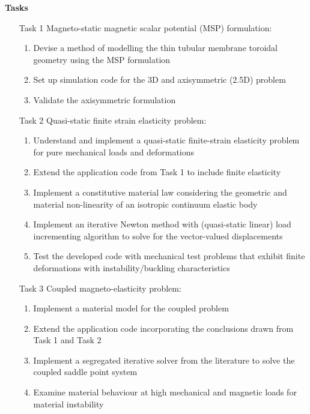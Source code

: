 \begin{center}
\Huge \bf Tasks
\end{center}
\label{sec:task_list}
\begin{enumerate}
\item[Task 1] Magneto-static magnetic scalar potential (MSP) formulation:
\begin{enumerate}
\item Devise a method of modelling the thin tubular membrane toroidal geometry using the MSP formulation 
\item Set up simulation code for the 3D and axisymmetric (2.5D) problem
\item Validate the axisymmetric formulation 
\end{enumerate}
\item[Task 2] Quasi-static finite strain elasticity problem:
\begin{enumerate}
\item Understand and implement a quasi-static finite-strain elasticity problem for pure mechanical loads and deformations \cite{Pelteret2016a, Pelteret2012}
\item Extend the application code from Task 1 to include finite elasticity
\item Implement a constitutive material law considering the geometric and material non-linearity of an isotropic continuum elastic body \cite{Wriggers2008}
\item Implement an iterative Newton method with (quasi-static linear) load incrementing algorithm to solve for the vector-valued displacements
\item Test the developed code with mechanical test problems that exhibit finite deformations with instability/buckling characteristics
\end{enumerate}
\item[Task 3] Coupled magneto-elasticity problem:
\begin{enumerate}
\item Implement a material model for the coupled problem \cite{pelteret2016, Saxena2015}
\item Extend the application code incorporating the conclusions drawn from Task 1 and Task 2
\item Implement a segregated iterative solver from the literature \cite{Benzi2005} to solve the coupled saddle point system
\item Examine material behaviour at high mechanical and magnetic loads for material instability
\end{enumerate}
\end{enumerate}